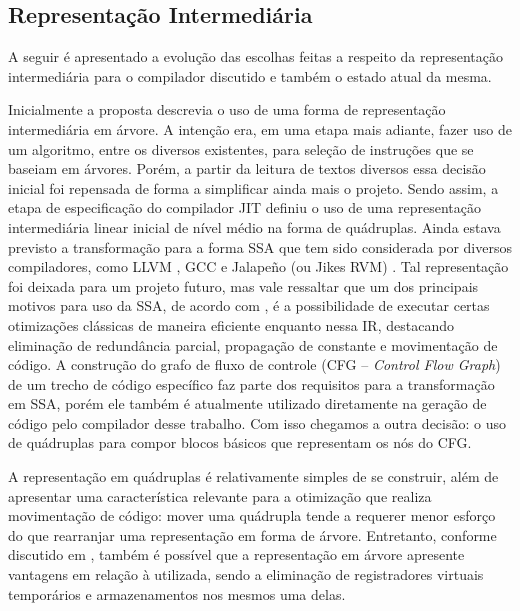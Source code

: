 \subsection{Representação Intermediária}
A seguir é apresentado a evolução das escolhas feitas a respeito da
representação intermediária para o compilador discutido e também o
estado atual da mesma.

Inicialmente a proposta descrevia o uso de uma forma de representação
intermediária em árvore. A intenção era, em uma etapa mais adiante,
fazer uso de um algoritmo, entre os diversos existentes, para seleção
de instruções que se baseiam em árvores. %
Porém, a partir da leitura de
textos diversos essa decisão inicial foi repensada de forma a
simplificar ainda mais o projeto.
Sendo assim, a etapa de especificação do compilador JIT
definiu o uso de uma representação intermediária linear inicial de nível
médio na forma de
quádruplas. Ainda estava previsto a transformação para a forma SSA que
tem sido considerada por diversos compiladores, como LLVM
\cite{llvm1}, GCC \cite{gcc-ssa} e Jalapeño (ou Jikes RVM)
\cite{jalapeno_1}. Tal representação foi deixada para um projeto futuro,
mas vale ressaltar que um dos principais motivos para uso da SSA, de
acordo com , é a possibilidade de executar certas
otimizações clássicas de maneira eficiente
enquanto nessa IR, destacando eliminação de redundância parcial,
propagação de constante e movimentação de código.
A construção do grafo de fluxo de controle (CFG
-- \textit{Control Flow Graph}) de um trecho de código específico faz
parte dos requisitos para a transformação em SSA, porém ele também é
atualmente utilizado diretamente na geração de código pelo compilador
desse trabalho. Com isso
chegamos a outra decisão: o uso de quádruplas para compor blocos
básicos que representam os nós do CFG.

A representação em quádruplas é relativamente simples de se construir,
além de apresentar uma característica relevante para a otimização que
realiza movimentação de código: mover uma quádrupla tende a requerer
menor esforço do que rearranjar uma representação em forma de
árvore. Entretanto, conforme discutido em ,
também é possível que a representação em árvore apresente vantagens
em relação à utilizada, sendo a eliminação de registradores virtuais
temporários e armazenamentos nos mesmos uma delas.

